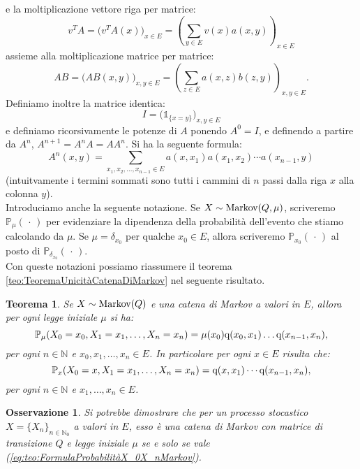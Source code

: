 \documentclass[11pt]{book}
\theoremstyle{Definizione}
\theoremstyle{TeoremaProposizioneLemmaCorollario}
\newtheorem{myteo}{Teorema}[section]
\theoremstyle{OsservazioneNota}
\newtheorem{myobs}{Osservazione}[section]
\newcommand{\N}{\mathbb{N}}
\renewcommand{\P}{\mathbb{P}}
\newcommand{\q}{\textup{q}}
\newcommand{\uno}[1]{\mathds{1}_{#1}}
\begin{document}
e la moltiplicazione vettore riga per matrice:
$$
v^TA = \big(v^TA(x)\big)_{x\in E} = \left(\sum_{y\in E} v(x)a(x,y)\right)_{x\in E}
$$
assieme alla moltiplicazione matrice per matrice:
$$
AB = \big(AB(x,y)\big)_{x,y\in E} = \left(\sum_{z\in E} a(x,z)b(z,y)\right)_{x,y\in E}.
$$
Definiamo inoltre la matrice identica:
$$
I = \big(\uno{\{x = y\}}\big)_{x,y\in E}
$$
e definiamo ricorsivamente le potenze di $A$ ponendo $A^0=I$, e definendo a partire da $A^n$, $A^{n+1} = A^nA = AA^n$. Si ha la seguente formula:
\begin{equation}\label{eq:FormulaPotenzaMatrice}
A^n(x,y) = \sum_{x_1,x_2,\dots,x_{n-1}\in E} a(x,x_1)a(x_1,x_2)\cdots a(x_{n-1},y)
\end{equation}
(intuitvamente i termini sommati sono tutti i cammini di $n$ passi dalla riga $x$ alla colonna $y$).\\
\indent
Introduciamo anche la seguente notazione. Se $X \sim \textup{Markov}(Q,\mu)$, scriveremo $\P_{\mu}(\, \cdot \,)$ per evidenziare la dipendenza della probabilità dell'evento che stiamo calcolando da $\mu$. Se $\mu = \delta_{x_0}$ per qualche $x_0 \in E$, allora scriveremo $\P_{x_0}(\,\cdot\,)$ al posto di $\P_{\delta_{x_0}}(\,\cdot\,)$.\\
Con queste notazioni possiamo riassumere il teorema \ref{teo:TeoremaUnicitàCatenaDiMarkov} nel seguente risultato.
\begin{boxteo}{}
\begin{myteo}
Se $X \sim \textup{Markov}(Q)$ e una catena di Markov a valori in $E$, allora per ogni legge iniziale $\mu$ si ha:
\begin{equation}\label{eq:teo:FormulaProbabilitàX_0X_nMarkov}
\P_\mu(X_0 = x_0,X_1 = x_1,\dots,X_n = x_n) = \mu(x_0) \q(x_0,x_1)\dots \q(x_{n-1},x_n),
\end{equation}
per ogni $n\in \N$ e $x_0,x_1,\dots,x_n\in E$. In particolare per ogni $x\in E$ risulta che:
\begin{equation}\label{eq:teo:FormulaProbabilitàX_0X_nMarkovParticolare}
\P_x(X_0 = x,X_1 = x_1,\dots,X_n = x_n) = \q(x,x_1)\cdots \q(x_{n-1},x_n),
\end{equation}
per ogni $n\in \N$ e $x_1,\dots,x_n\in E$.
\end{myteo}
\end{boxteo}
\begin{myobs}
Si potrebbe dimostrare che per un processo stocastico $X = \{X_n\}_{n\in \N_0}$ a valori in $E$, esso è una catena di Markov con matrice di transizione $Q$ e legge iniziale $\mu$ se e solo se vale (\ref{eq:teo:FormulaProbabilitàX_0X_nMarkov}).
\end{myobs}
\end{document}
